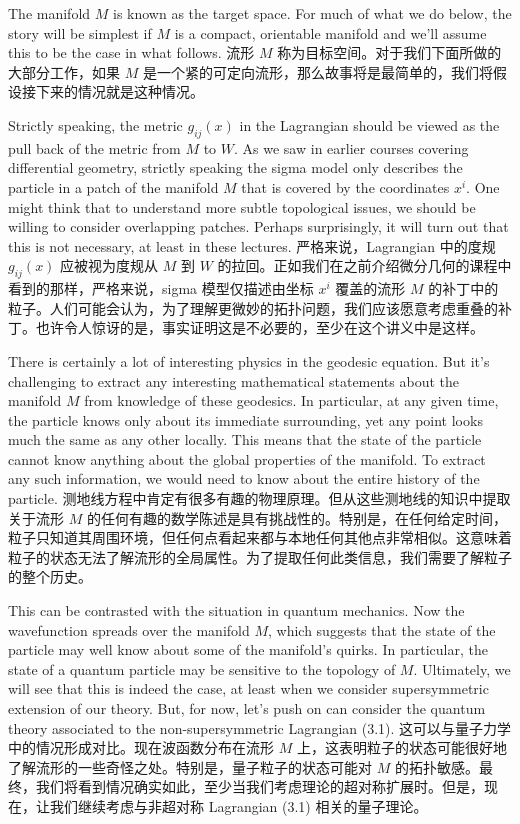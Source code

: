 \documentclass{ctexart}
\begin{document}
\begin{paracol}{2}
The manifold $M$ is known as the target space. For much of what we do below, the story will be simplest if $M$ is a compact, orientable manifold and we’ll assume this to be the case in what follows.
\switchcolumn
流形 $M$ 称为目标空间。对于我们下面所做的大部分工作，如果 $M$ 是一个紧的可定向流形，那么故事将是最简单的，我们将假设接下来的情况就是这种情况。
\switchcolumn*

Strictly speaking, the metric $g_{ij}(x)$ in the Lagrangian should be viewed as the pull back of the metric from $M$ to $W$. As we saw in earlier courses covering differential geometry, strictly speaking the sigma model only describes the particle in a patch of the manifold $M$ that is covered by the coordinates $x^i$. One might think that to understand more subtle topological issues, we should be willing to consider overlapping patches. Perhaps surprisingly, it will turn out that this is not necessary, at least in these lectures.
\switchcolumn
严格来说，Lagrangian 中的度规 $g_{ij}(x)$ 应被视为度规从 $M$ 到 $W$ 的拉回。正如我们在之前介绍微分几何的课程中看到的那样，严格来说，sigma 模型仅描述由坐标 $x^i$ 覆盖的流形 $M$ 的补丁中的粒子。人们可能会认为，为了理解更微妙的拓扑问题，我们应该愿意考虑重叠的补丁。也许令人惊讶的是，事实证明这是不必要的，至少在这个讲义中是这样。
\switchcolumn*

There is certainly a lot of interesting physics in the geodesic equation. But it's challenging to extract any interesting mathematical statements about the manifold $M$ from knowledge of these geodesics. In particular, at any given time, the particle knows only about its immediate surrounding, yet any point looks much the same as any other locally. This means that the state of the particle cannot know anything about the global properties of the manifold. To extract any such information, we would need to know about the entire history of the particle.
\switchcolumn
测地线方程中肯定有很多有趣的物理原理。但从这些测地线的知识中提取关于流形 $M$ 的任何有趣的数学陈述是具有挑战性的。特别是，在任何给定时间，粒子只知道其周围环境，但任何点看起来都与本地任何其他点非常相似。这意味着粒子的状态无法了解流形的全局属性。为了提取任何此类信息，我们需要了解粒子的整个历史。
\switchcolumn*

This can be contrasted with the situation in quantum mechanics. Now the wavefunction spreads over the manifold $M$, which suggests that the state of the particle may well know about some of the manifold’s quirks. In particular, the state of a quantum particle may be sensitive to the topology of $M$. Ultimately, we will see that this is indeed the case, at least when we consider supersymmetric extension of our theory. But, for now, let’s push on can consider the quantum theory associated to the non-supersymmetric Lagrangian (3.1).
\switchcolumn
这可以与量子力学中的情况形成对比。现在波函数分布在流形 $M$ 上，这表明粒子的状态可能很好地了解流形的一些奇怪之处。特别是，量子粒子的状态可能对 $M$ 的拓扑敏感。最终，我们将看到情况确实如此，至少当我们考虑理论的超对称扩展时。但是，现在，让我们继续考虑与非超对称 Lagrangian (3.1) 相关的量子理论。
\switchcolumn*


\end{paracol}
\end{document}

